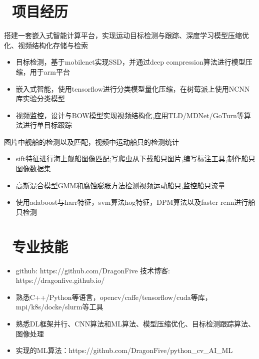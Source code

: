 \documentclass{resume}
\begin{document}
\section{\faCogs\ 项目经历}
搭建一套嵌入式智能计算平台，实现运动目标检测与跟踪、深度学习模型压缩优化、视频结构化存储与检索
\begin{itemize}
  \item 目标检测，基于mobilenet实现SSD，并通过deep compression算法进行模型压缩，用于arm平台
  \item 嵌入式智能，使用tensorflow进行分类模型量化压缩，在树莓派上使用NCNN库实验分类模型
  \item 视频监控，设计与BOW模型实现视频结构化,应用TLD/MDNet/GoTurn等算法进行单目标跟踪
\end{itemize}


图片中舰船的检测以及匹配，视频中运动船只的检测统计
\begin{itemize}
  \item sift特征进行海上舰船图像匹配;写爬虫从下载船只图片,编写标注工具,制作船只图像数据集
  \item 高斯混合模型GMM和腐蚀膨胀方法检测视频运动船只,监控船只流量
  \item 使用adaboost与harr特征，svm算法hog特征，DPM算法以及faster rcnn进行船只检测
\end{itemize}




\section{\faInfo\ 专业技能}
\begin{itemize}[parsep=0.5ex]
  \item github: https://github.com/DragonFive 技术博客: https://dragonfive.github.io/
  \item 熟悉C++/Python等语言，opencv/caffe/tensorflow/cuda等库，mpi/k8s/docke/slurm等工具
  \item 熟悉DL框架并行、CNN算法和ML算法、模型压缩优化、目标检测跟踪算法、图像处理
  \item 实现的ML算法：https://github.com/DragonFive/python\_cv\_AI\_ML 
\end{itemize}

%
%
\end{document}
